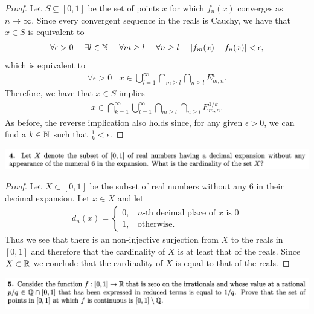 \begin{proof}
  Let $S \subseteq [0, 1]$ be the set of points $x$ for which $f_n(x)$ converges as $n \to \infty$. Since every
  convergent sequence in the reals is Cauchy, we have that $x \in S$ is equivalent to
  \begin{align*}
    \forall \epsilon > 0 ~~~~ \exists l \in \mathbb{N} ~~~~ \forall m \geq l ~~~~ \forall n \geq l ~~~~ |f_m(x) - f_n(x)| < \epsilon,
  \end{align*}
  which is equivalent to
  \begin{align*}
    \forall \epsilon > 0 ~~~~ x \in \bigcup_{l=1}^\infty \bigcap_{m \geq l} \bigcap_{n \geq l} E_{m,n}^\epsilon.
  \end{align*}
  Therefore, we have that $x \in S$ implies
  \begin{align*}
    x \in \bigcap_{k=1}^\infty \bigcup_{l=1}^\infty \bigcap_{m \geq l} \bigcap_{n \geq l} E_{m,n}^{1/k}.
  \end{align*}
  As before, the reverse implication also holds since, for any given $\epsilon > 0$, we can find a $k \in \mathbb{N}$
  such that $\frac{1}{k} < \epsilon$.
\end{proof}

\newpage
\begin{mdframed}
\includegraphics[width=400pt]{img/analysis--berkeley-202a--homework-1-f175.png}
\end{mdframed}


\begin{proof}
  Let $X \subset [0, 1]$ be the subset of real numbers without any 6 in their decimal expansion. Let $x \in X$ and let
  \begin{align*}
    d_n(x) =
    \begin{cases}
      0, ~~~~ n\text{-th decimal place of }x \text{ is }0\\
      1, ~~~~ \text{otherwise}.
    \end{cases}
  \end{align*}
  Thus we see that there is an non-injective surjection from $X$ to the reals in $[0, 1]$ and therefore that
  the cardinality of $X$ is at least that of the reals. Since $X \subset \mathbb{R}$ we conclude that the cardinality
  of $X$ is equal to that of the reals.
\end{proof}

\newpage
\begin{mdframed}
\includegraphics[width=400pt]{img/analysis--berkeley-202a--homework-1-5192.png}
\end{mdframed}



